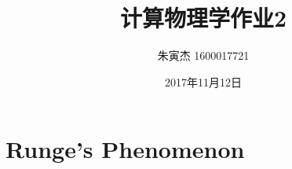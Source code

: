 \documentclass[UTF8]{ctexart}
\title{计算物理学作业2}
\author{朱寅杰 1600017721}
\date{2017年11月12日}
\begin{document}
\maketitle

\section{Runge's Phenomenon}
\end{document}
